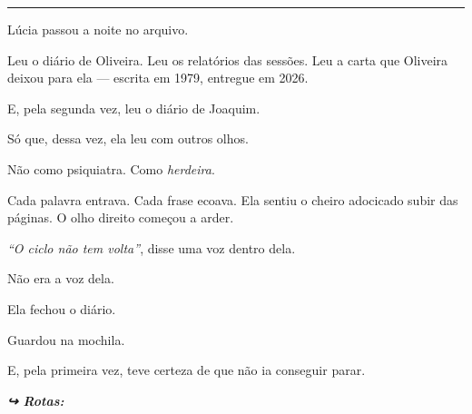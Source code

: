 \vspace{0.5em}\noindent\rule{\textwidth}{0.5pt}\vspace{0.5em}

\noindent Lúcia passou a noite no arquivo.

\noindent Leu o diário de Oliveira. Leu os relatórios das sessões. Leu a carta que Oliveira deixou para ela --- escrita em 1979, entregue em 2026.

\noindent E, pela segunda vez, leu o diário de Joaquim.

\noindent Só que, dessa vez, ela leu com outros olhos.

\noindent Não como psiquiatra.
Como \textit{herdeira}.

\noindent Cada palavra entrava. Cada frase ecoava. Ela sentiu o cheiro adocicado subir das páginas. O olho direito começou a arder.

\noindent \textit{\textquotedblleft{}O ciclo não tem volta\textquotedblright{}}, disse uma voz dentro dela.

\noindent Não era a voz dela.

\noindent Ela fechou o diário.

\noindent Guardou na mochila.

\noindent E, pela primeira vez, teve certeza de que não ia conseguir parar.

\vspace{0.5em}
\noindent\textit{\textbf{↪ Rotas:}  \rotasep {}}